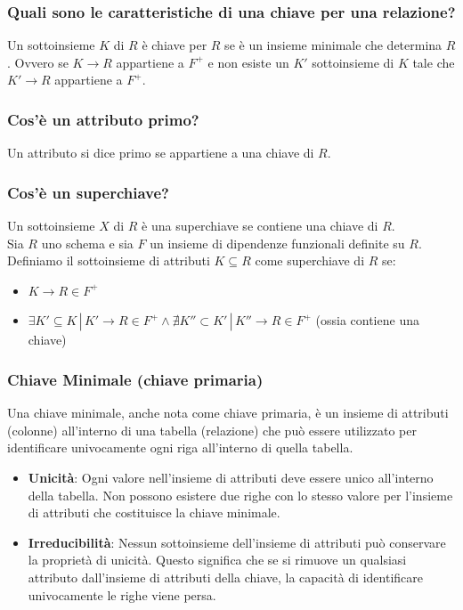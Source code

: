\documentclass{article}
\begin{document}
\subsubsection{Quali sono le caratteristiche di una chiave per una relazione?}
Un sottoinsieme $K$ di $R$ è chiave per $R$ se è un insieme minimale che determina $R$. Ovvero se $K \rightarrow R$ appartiene a $F^+$ e non esiste un $K'$ sottoinsieme di $K$ tale che $K' \rightarrow R$ appartiene a $F^+$.\\

\subsubsection{Cos'è un attributo primo?}
Un attributo si dice primo se appartiene a una chiave di $R$.\\

\subsubsection{Cos'è un superchiave?}
Un sottoinsieme $X$ di $R$ è una superchiave se contiene una chiave di $R$.\\

Sia $R$ uno schema e sia $F$ un insieme di dipendenze funzionali definite su $R$. Definiamo il sottoinsieme di attributi $K \subseteq R$ come superchiave di $R$ se:
\begin{itemize}
    \item $K \rightarrow R \in F^+$
    \item $\exists K' \subseteq K \,|\, K' \rightarrow R \in F^+ \land \nexists K'' \subset K' \,|\, K'' \rightarrow R \in F^+$ (ossia contiene una chiave)
\end{itemize}

\subsubsection{Chiave Minimale (chiave primaria)}
Una chiave minimale, anche nota come chiave primaria, è un insieme di attributi (colonne) all'interno di una tabella (relazione) che può essere utilizzato per identificare univocamente ogni riga all'interno di quella tabella.
\begin{itemize}
  \item \textbf{Unicità}: Ogni valore nell'insieme di attributi deve essere unico all'interno della tabella. Non possono esistere due righe con lo stesso valore per l'insieme di attributi che costituisce la chiave minimale.
  \item \textbf{Irreducibilità}: Nessun sottoinsieme dell'insieme di attributi può conservare la proprietà di unicità. Questo significa che se si rimuove un qualsiasi attributo dall'insieme di attributi della chiave, la capacità di identificare univocamente le righe viene persa.
\end{itemize}
\end{document}
